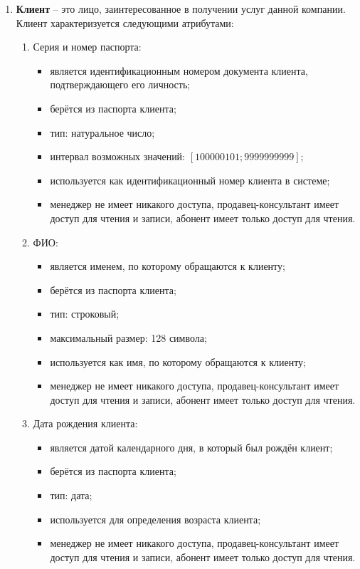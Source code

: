 \begin{enumerate}
    \item \textbf{Клиент} -- это лицо, заинтересованное в получении услуг данной компании. Клиент характеризуется следующими атрибутами:
    \begin{enumerate}
        \item Серия и номер паспорта:
        \begin{itemize}
            \item является идентификационным номером документа клиента, подтверждающего его личность;
            \item берётся из паспорта клиента;
            \item тип: натуральное число;
            \item интервал возможных значений: $[100 000 101; 9 999 999 999]$;
            \item используется как идентификационный номер клиента в системе;
            \item менеджер не имеет никакого доступа, продавец-консультант имеет доступ для чтения и записи, абонент имеет только доступ для чтения.
        \end{itemize}

        \item ФИО:
        \begin{itemize}
            \item является именем, по которому обращаются к клиенту;
            \item берётся из паспорта клиента;
            \item тип: строковый;
            \item максимальный размер: 128 символа;
            \item используется как имя, по которому обращаются к клиенту;
            \item менеджер не имеет никакого доступа, продавец-консультант имеет доступ для чтения и записи, абонент имеет только доступ для чтения.
        \end{itemize}

        \item Дата рождения клиента:
        \begin{itemize}
            \item является датой календарного дня, в который был рождён клиент;
            \item берётся из паспорта клиента;
            \item тип: дата;
            \item используется для определения возраста клиента;
            \item менеджер не имеет никакого доступа, продавец-консультант имеет доступ для чтения и записи, абонент имеет только доступ для чтения.
        \end{itemize}


\end{enumerate}
\end{enumerate}
